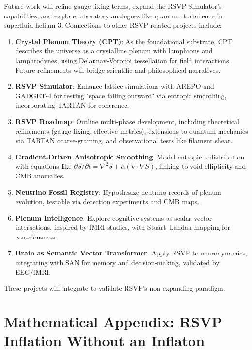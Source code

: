 \documentclass[12pt, a4paper, openany]{book}
\theoremstyle{definition}
\begin{document}
Future work will refine gauge-fixing terms, expand the RSVP Simulator’s capabilities, and explore laboratory analogues like quantum turbulence in superfluid helium-3. Connections to other RSVP-related projects include:

\begin{enumerate}
    \item \textbf{Crystal Plenum Theory (CPT)}: As the foundational substrate, CPT describes the universe as a crystalline plenum with lamphrons and lamphrodynes, using Delaunay-Voronoi tessellation for field interactions. Future refinements will bridge scientific and philosophical narratives.
    \item \textbf{RSVP Simulator}: Enhance lattice simulations with AREPO and GADGET-4 for testing "space falling outward" via entropic smoothing, incorporating TARTAN for coherence.
    \item \textbf{RSVP Roadmap}: Outline multi-phase development, including theoretical refinements (gauge-fixing, effective metrics), extensions to quantum mechanics via TARTAN coarse-graining, and observational tests like filament shear.
    \item \textbf{Gradient-Driven Anisotropic Smoothing}: Model entropic redistribution with equations like $\partial S / \partial t = \nabla^2 S + \alpha (\mathbf{v} \cdot \nabla S)$, linking to void ellipticity and CMB anomalies.
    \item \textbf{Neutrino Fossil Registry}: Hypothesize neutrino records of plenum evolution, testable via detection experiments and CMB maps.
    \item \textbf{Plenum Intelligence}: Explore cognitive systems as scalar-vector interactions, inspired by fMRI studies, with Stuart–Landau mapping for consciousness.
    \item \textbf{Brain as Semantic Vector Transformer}: Apply RSVP to neurodynamics, integrating with SAN for memory and decision-making, validated by EEG/fMRI.
\end{enumerate}

These projects will integrate to validate RSVP's non-expanding paradigm.

\appendix
\renewcommand{\thesection}{\Alph{section}}
\renewcommand{\thesubsection}{\thesection.\arabic{subsection}}

\chapter{Mathematical Appendix: RSVP Inflation Without an Inflaton}
\end{document}
